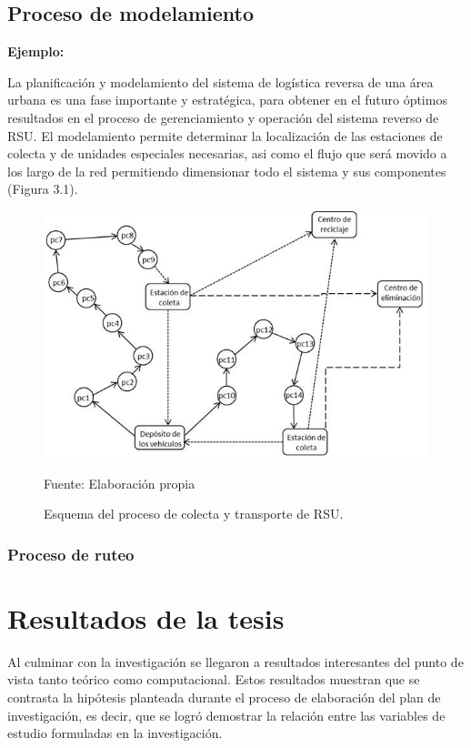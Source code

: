 \section{Proceso de modelamiento} 

{\bf Ejemplo:}\par

La planificación y modelamiento del sistema de logística reversa de una área urbana es una fase importante y estratégica, para obtener en el futuro óptimos resultados en el proceso de gerenciamiento y operación del sistema reverso de RSU. El modelamiento permite determinar la localización de las estaciones de colecta y de unidades especiales necesarias, asi como el flujo que será movido a los largo de la red permitiendo dimensionar todo el sistema y sus componentes (Figura 3.1).
\vskip 0.3cm
\begin{figure}[ht]
\begin{center}
\includegraphics[width=.6\textwidth]{Figura3}
\end{center}
\begin{center}
\vskip -0.5cm
\caption{\small{Esquema del proceso de colecta y transporte de RSU.}}
{\small{Fuente: Elaboración propia}}
\end{center}
\end{figure}

\subsection{Proceso de ruteo}



\chapter{Resultados de la tesis}


Al culminar con la investigación se llegaron a resultados interesantes del punto de vista tanto teórico como computacional. Estos resultados muestran que se contrasta la hipótesis planteada durante el proceso de elaboración del plan de investigación, es decir, que se logró demostrar la relación entre las variables de estudio formuladas en la investigación.

